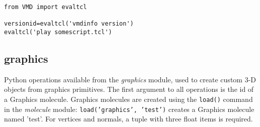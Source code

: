 \begin{verbatim}
from VMD import evaltcl

versionid=evaltcl('vmdinfo version')
evaltcl('play somescript.tcl')
\end{verbatim}


\subsection{graphics}

Python operations available from the {\it graphics} module, used to
create custom 3-D objects from graphics primitives.  The first argument to all
operations is the id of a Graphics molecule.  Graphics molecules are created
using the {\tt load()} command in the {\it molecule} module:
{\tt load('graphics', 'test')} creates a Graphics molecule named 'test'.  For
vertices and normals, a tuple with three float items is required.

